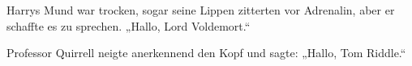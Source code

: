 Harrys Mund war trocken, sogar seine Lippen zitterten vor Adrenalin, aber er schaffte es zu sprechen.
„Hallo, Lord Voldemort.“

Professor Quirrell neigte anerkennend den Kopf und sagte:
„Hallo, Tom Riddle.“

